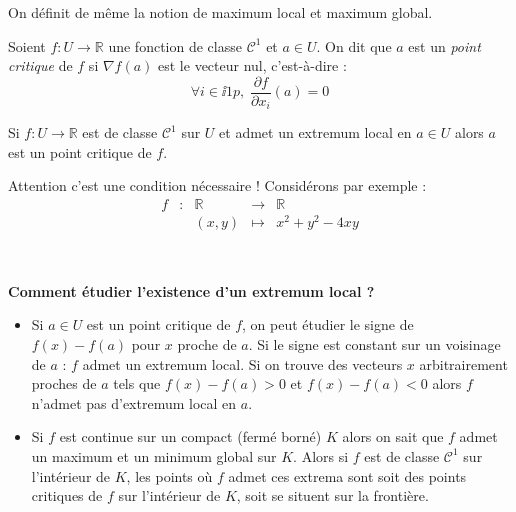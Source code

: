 \documentclass[french,11pt,twoside]{VcCours}
\begin{document}
\begin{Remarque}{} On définit de même la notion de maximum local et maximum global.
\end{Remarque}

\begin{Definition}{}
Soient $f : U \rightarrow \mathbb{R}$ une fonction de classe $\mathcal{C}^1$ et $a \in U$. On dit que $a$ est un \emph{point critique} de $f$ si $\nabla f (a)$ est le vecteur nul, c'est-à-dire :
$$ \forall i \in \ii{1}{p}, \; \dfrac{\partial f}{\partial x_i}(a)= 0 $$
\end{Definition}

\begin{Proposition}{}
Si $f : U \rightarrow \mathbb{R}$ est de classe $\mathcal{C}^1$ sur $U$ et admet un extremum local en $a \in U$ alors $a$ est un point critique de $f$.
\end{Proposition}

\begin{Demonstration}{}

\vspace*{5cm}
\end{Demonstration}


\begin{Remarque}{}
Attention c'est une condition nécessaire ! Considérons par exemple :
$$ \begin{array}{cccll}
f& : & \mathbb{R} & \rightarrow & \mathbb{R} \\
& & (x,y) & \mapsto & x^2+y^2-4xy 
\end{array}$$

\vspace*{4cm}~
\end{Remarque}

\medskip

\begin{center}
\textbf{Comment étudier l'existence d'un extremum local ?}
\end{center}

\medskip

\begin{itemize}
\item Si $a \in U$ est un point critique de $f$, on peut étudier le signe de $f(x)-f(a)$ pour $x$ proche de $a$. Si le signe est constant sur un voisinage de $a$ : $f$ admet un extremum local. Si on trouve des vecteurs $x$ arbitrairement proches de $a$ tels que $f(x)-f(a)>0$ et $f(x)-f(a)<0$ alors $f$ n'admet pas d'extremum local en $a$.
\item Si $f$ est continue sur un compact (fermé borné) $K$ alors on sait que $f$ admet un maximum et un minimum global sur $K$. Alors si $f$ est de classe $\mathcal{C}^1$ sur l'intérieur de $K$, les points où $f$ admet ces extrema sont soit des points critiques de $f$ sur l'intérieur de $K$, soit se situent sur la frontière.
\end{itemize}
\end{document}

